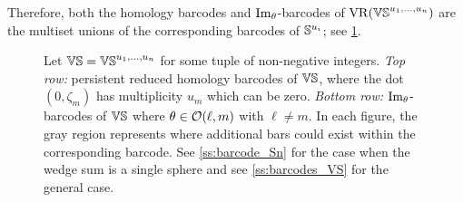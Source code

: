 Therefore, both the homology barcodes and \(\operatorname{Im}_\theta\)-barcodes of \(\mathrm{VR}(\mathbb{VS}^{u_1, \dots, u_n})\) are the multiset unions of the corresponding barcodes of \(\mathbb{S}^{u_i}\); see \cref{fig:barcodes_vs}.

\begin{figure}
	\centering
	
	\caption{Let $\mathbb{VS} = \mathbb{VS}^{u_1,\dots,u_n}$ for some tuple of non-negative integers.
		\emph{Top row:} persistent reduced homology barcodes of $\mathbb{VS}$, where the dot $(0,\zeta_m)$ has multiplicity $u_m$ which can be zero.
		\emph{Bottom row:} $\operatorname{Im}_\theta$-barcodes of $\mathbb{VS}$ where $\theta \in \mathcal{O}(\ell,m)$ with \(\ell \neq m\).
		In each figure, the gray region represents where additional bars could exist within the corresponding barcode.
		See \cref{ss:barcode_Sn} for the case when the wedge sum is a single sphere and see \cref{ss:barcodes_VS} for the general case.}
	\label{fig:barcodes_vs}
\end{figure}